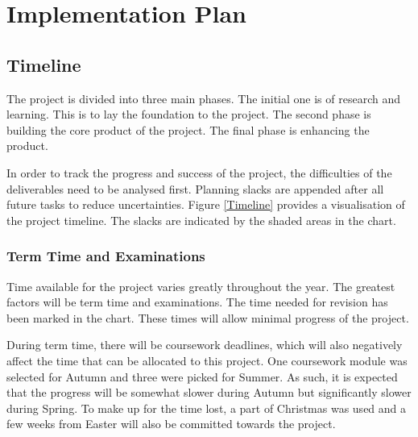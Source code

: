 \section{Implementation Plan}


\subsection{Timeline}
The project is divided into three main phases.
The initial one is of research and learning.
This is to lay the foundation to the project.
The second phase is building the core product of the project.
The final phase is enhancing the product.

In order to track the progress and success of the project, the difficulties
of the deliverables need to be analysed first.
Planning slacks are appended after all future tasks to reduce uncertainties.
Figure \ref{Timeline} provides a visualisation of the project timeline.
The slacks are indicated by the shaded areas in the chart.

\begin{figure*}[!b]
  \centering
  
  \caption{Project Timeline}
  \label{Timeline}
\end{figure*}

\subsubsection{Term Time and Examinations}
Time available for the project varies greatly throughout the year.
The greatest factors will be term time and examinations.
The time needed for revision has been marked in the chart.
These times will allow minimal progress of the project.

During term time, there will be coursework deadlines, which will also
negatively affect the time that can be allocated to this project.
One coursework module was selected for Autumn and three were picked for Summer.
As such, it is expected that the progress will be somewhat slower during Autumn
but significantly slower during Spring.
To make up for the time lost, a part of Christmas was used and a few weeks
from Easter will also be committed towards the project.

